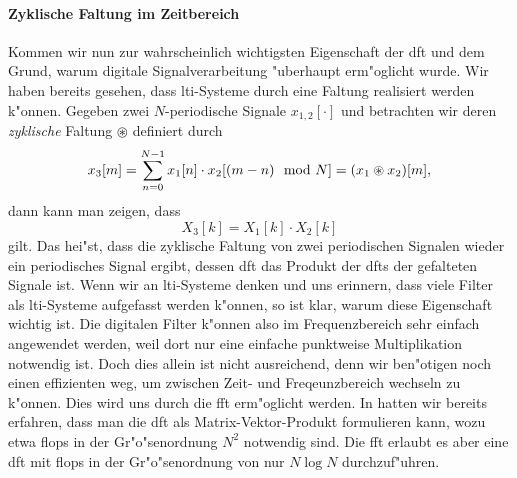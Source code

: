\paragraph{Zyklische Faltung im Zeitbereich}\label{par:fourier:cycl_conv}
%
Kommen wir nun zur wahrscheinlich wichtigsten Eigenschaft der \gls{dft} und dem Grund, warum digitale Signalverarbeitung "uberhaupt erm"oglicht wurde.
Wir haben bereits gesehen, dass \gls{lti}-Systeme durch eine Faltung realisiert werden k"onnen.
Gegeben zwei $N$-periodische Signale $x_{1,2}[\cdot]$ und betrachten wir deren \emph{zyklische} Faltung $\circledast$ definiert durch
\begin{equation}\label{eq:fourier:cyclic_conv}
x_3[m] = {\sum\limits_{n=0}^{N-1}{x_1[n] \cdot x_2[(m-n) \mod N]}} = (x_1 \circledast x_2)[m],
\end{equation}
dann kann man zeigen, dass
\[
X_3[k] = X_1[k] \cdot X_2[k]
\]
gilt.
Das hei"st, dass die zyklische Faltung von zwei periodischen Signalen wieder ein periodisches Signal ergibt, dessen \gls{dft} das Produkt der \glspl{dft} der gefalteten Signale ist.
Wenn wir an \gls{lti}-Systeme denken und uns erinnern, dass viele Filter als \gls{lti}-Systeme aufgefasst werden k"onnen, so ist klar, warum diese Eigenschaft wichtig ist.
Die digitalen Filter k"onnen also im Frequenzbereich sehr einfach angewendet werden, weil dort nur eine einfache punktweise Multiplikation notwendig ist.
Doch dies allein ist nicht ausreichend, denn wir ben"otigen noch einen effizienten weg, um zwischen Zeit- und Freqeunzbereich wechseln zu k"onnen.
Dies wird uns durch die \gls{fft} erm"oglicht werden.
In  hatten wir bereits erfahren, dass man die \gls{dft} als Matrix-Vektor-Produkt formulieren kann, wozu etwa \glspl{flop} in der Gr"o"senordnung $N^2$ notwendig sind.
Die \gls{fft} erlaubt es aber eine \gls{dft} mit \glspl{flop} in der Gr"o"senordnung von nur $N \log{N}$ durchzuf"uhren.

